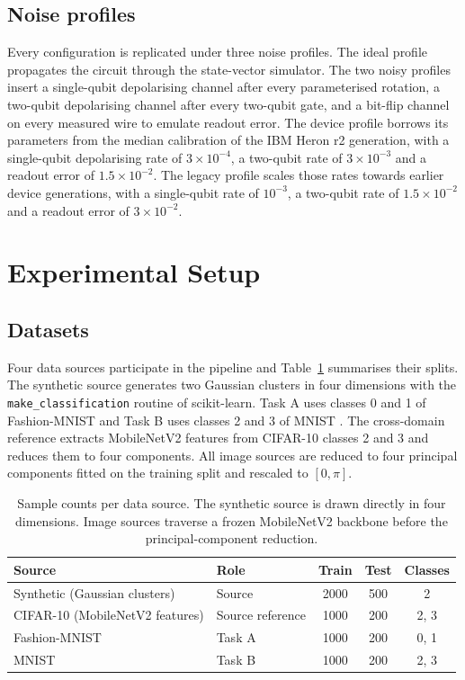 \documentclass[preprint,number,sort&compress]{elsarticle}
\begin{document}
\subsection{Noise profiles}

Every configuration is replicated under three noise profiles. The ideal
profile propagates the circuit through the state-vector simulator. The two
noisy profiles insert a single-qubit depolarising channel after every
parameterised rotation, a two-qubit depolarising channel after every two-qubit gate, and a bit-flip channel on every measured wire to
emulate readout error. The device profile borrows its parameters from the
median calibration of the IBM Heron r2 generation, with a single-qubit
depolarising rate of $3\times10^{-4}$, a two-qubit rate of $3\times10^{-3}$
and a readout error of $1.5\times10^{-2}$. The legacy profile scales those
rates towards earlier device generations, with a single-qubit rate of
$10^{-3}$, a two-qubit rate of $1.5\times10^{-2}$ and a readout error of
$3\times10^{-2}$.

\section{Experimental Setup}
\label{sec:setup}

\subsection{Datasets}

Four data sources participate in the pipeline and Table~\ref{tab:datasets}
summarises their splits. The synthetic source generates two Gaussian
clusters in four dimensions with the \texttt{make\_classification} routine of
scikit-learn. Task A uses classes 0 and 1 of Fashion-MNIST \cite{Xiao17} and
Task B uses classes 2 and 3 of MNIST \cite{Lecun98}. The cross-domain
reference extracts MobileNetV2 features from CIFAR-10 classes 2 and 3
\cite{krizhevsky2009cifar, Sandler18} and reduces them to four components.
All image sources are reduced to four principal components fitted on the
training split and rescaled to $[0,\pi]$.

\begin{table}[ht]
\centering
\caption{Sample counts per data source. The synthetic source is drawn
directly in four dimensions. Image sources traverse a frozen MobileNetV2
backbone before the principal-component reduction.}
\label{tab:datasets}
\begin{tabular}{llccc}
\toprule
Source & Role & Train & Test & Classes \\
\midrule
Synthetic (Gaussian clusters) & Source & 2000 & 500 & 2 \\
CIFAR-10 (MobileNetV2 features) & Source reference & 1000 & 200 & 2, 3 \\
Fashion-MNIST & Task A & 1000 & 200 & 0, 1 \\
MNIST & Task B & 1000 & 200 & 2, 3 \\
\bottomrule
\end{tabular}
\end{table}
\end{document}
